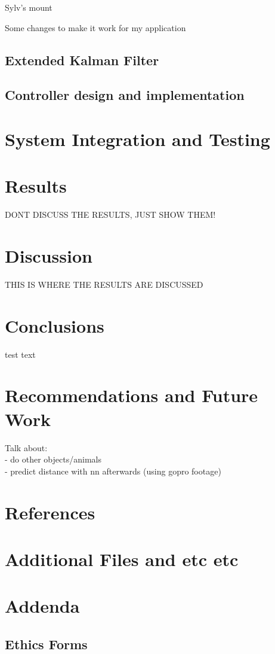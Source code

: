 \documentclass{article}
\begin{document}
Sylv's mount

Some changes to make it work for my application

\subsection{Extended Kalman Filter}

\subsection{Controller design and implementation}

\section{System Integration and Testing}

\section{Results}
DONT DISCUSS THE RESULTS, JUST SHOW THEM!

\section{Discussion}
THIS IS WHERE THE RESULTS ARE DISCUSSED

\section{Conclusions}
test text

\section{Recommendations and Future Work}
Talk about: \\
- do other objects/animals \\
- predict distance with nn afterwards (using gopro footage)

\section{References}

\appendix
\section{Additional Files and etc etc}

\section{Addenda}
\subsection{Ethics Forms}

\end{document}
